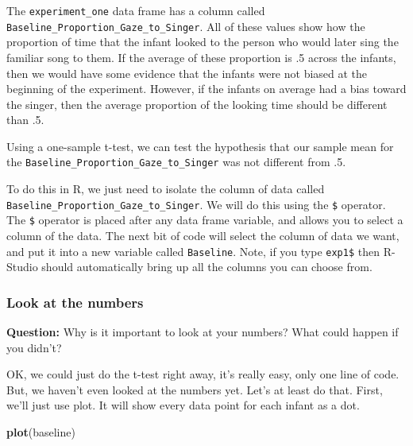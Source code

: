 \documentclass[]{book}
\newenvironment{Shaded}{\begin{snugshade}}{\end{snugshade}}
\newcommand{\KeywordTok}[1]{\textcolor[rgb]{0.13,0.29,0.53}{\textbf{#1}}}
\newcommand{\StringTok}[1]{\textcolor[rgb]{0.31,0.60,0.02}{#1}}
\newcommand{\OperatorTok}[1]{\textcolor[rgb]{0.81,0.36,0.00}{\textbf{#1}}}
\newcommand{\NormalTok}[1]{#1}
\begin{document}
The \texttt{experiment\_one} data frame has a column called
\texttt{Baseline\_Proportion\_Gaze\_to\_Singer}. All of these values
show how the proportion of time that the infant looked to the person who
would later sing the familiar song to them. If the average of these
proportion is .5 across the infants, then we would have some evidence
that the infants were not biased at the beginning of the experiment.
However, if the infants on average had a bias toward the singer, then
the average proportion of the looking time should be different than .5.

Using a one-sample t-test, we can test the hypothesis that our sample
mean for the \texttt{Baseline\_Proportion\_Gaze\_to\_Singer} was not
different from .5.

To do this in R, we just need to isolate the column of data called
\texttt{Baseline\_Proportion\_Gaze\_to\_Singer}. We will do this using
the \texttt{\$} operator. The \texttt{\$} operator is placed after any
data frame variable, and allows you to select a column of the data. The
next bit of code will select the column of data we want, and put it into
a new variable called \texttt{Baseline}. Note, if you type
\texttt{exp1\$} then R-Studio should automatically bring up all the
columns you can choose from.

\begin{Shaded}
\end{Shaded}

\subsubsection{Look at the numbers}\label{look-at-the-numbers}

\textbf{Question:} Why is it important to look at your numbers? What
could happen if you didn't?

OK, we could just do the t-test right away, it's really easy, only one
line of code. But, we haven't even looked at the numbers yet. Let's at
least do that. First, we'll just use plot. It will show every data point
for each infant as a dot.

\begin{Shaded}
\begin{Highlighting}[]
\KeywordTok{plot}\NormalTok{(baseline)}
\end{Highlighting}
\end{Shaded}
\end{document}
